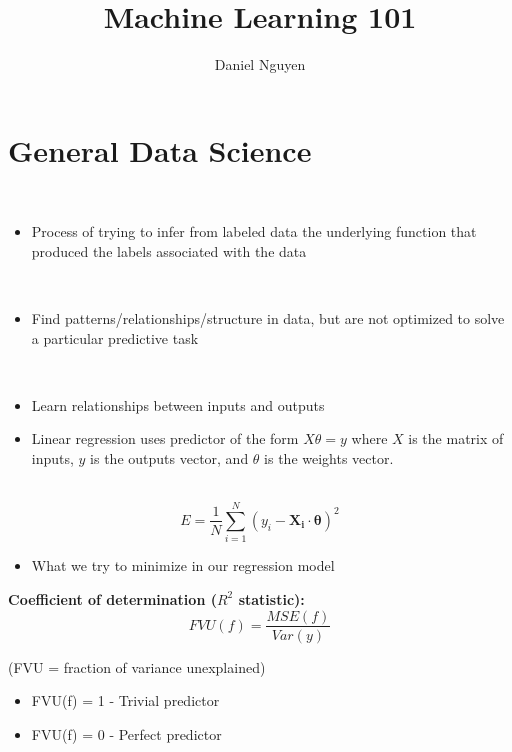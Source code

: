 \documentclass[12pt]{article}
\newenvironment{concept}[1]{\begin{trivlist}
		\item[\hskip \labelsep {\bfseries #1}]}{\end{trivlist}}
\begin{document}
 
\title{Machine Learning 101}
\author{Daniel Nguyen}
\maketitle
 
\section{General Data Science}
\begin{concept}{Supervised Learning}
	\
	\begin{itemize}
		\item {
			Process of trying to infer from labeled data the underlying function that produced the labels associated with the data
		}
	\end{itemize}
\end{concept}

\begin{concept}{Unsupervised Learning}
	\
	\begin{itemize}
		\item {
			Find patterns/relationships/structure in data, but are not optimized to solve a particular predictive task
		}
	\end{itemize}
\end{concept}
\begin{concept}{Regression}
	\
	\begin{itemize}
		\item {
			Learn relationships between inputs and outputs
		}
		\item {
			Linear regression uses predictor of the form $X\theta = y$ where $X$ is the matrix of inputs, $y$ is the outputs vector, and $\theta$ is the weights vector.
		}
	\end{itemize}
\end{concept}

\begin{concept}{Mean-squared Error}
	\
	$$E = \frac{1}{N} \sum_{i=1}^{N} (y_i - \boldsymbol{X_i} \cdot \boldsymbol{\theta})^2$$
	\begin{itemize}
		\item {
			What we try to minimize in our regression model
		}
	\end{itemize}

	\textbf{Coefficient of determination ($R^2$ statistic):}
	$$FVU(f) = \frac{MSE(f)}{Var(y)}$$
	
	(FVU = fraction of variance unexplained)
	\begin{itemize}
		\item {
			FVU(f) = 1 - Trivial predictor
		}
		\item {
			FVU(f) = 0 - Perfect predictor
		}
	\end{itemize}
\end{concept}
\end{document}
